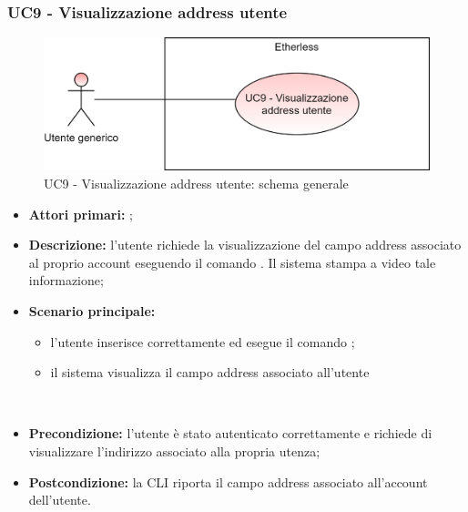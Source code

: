 \subsubsection{UC9 - Visualizzazione address utente}
\begin{figure}[h]
	\centering
	\includegraphics[scale=\ucs]{./res/img/UC9G.png}
	\caption {UC9 - Visualizzazione address utente: schema generale}
\end{figure}
\begin{itemize}
	\item \textbf{Attori primari:} \ua{};
	\item \textbf{Descrizione:} l’utente richiede la visualizzazione del campo address associato al proprio account eseguendo il comando \whoami{}. Il sistema stampa a video tale informazione; 
	\item \textbf{Scenario principale:} 
	\begin{itemize}
		\item l'utente inserisce correttamente ed esegue il comando \whoami{}; 
		\item il sistema visualizza il campo address associato all’utente
	\end{itemize}  
	\item \textbf{Precondizione:} l’utente è stato autenticato correttamente e richiede di visualizzare l’indirizzo associato alla propria utenza;
	\item \textbf{Postcondizione:} la CLI riporta il campo address associato all’account dell’utente.
\end{itemize}